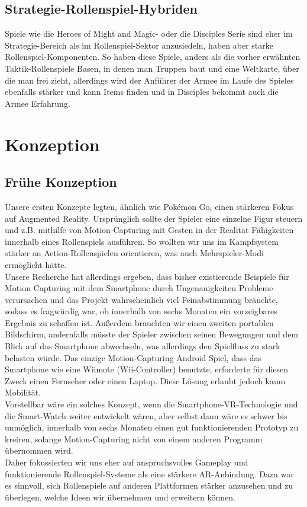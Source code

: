 \documentclass[extern,palatino]{cgBA}
\begin{document}
\subsection{Strategie-Rollenspiel-Hybriden} Spiele wie die Heroes of Might and Magic- oder die Disciples Serie sind eher im Strategie-Bereich als im Rollenspiel-Sektor anzusiedeln, haben aber starke Rollenspiel-Komponenten. So haben diese Spiele, anders als die vorher erwähnten Taktik-Rollenspiele Basen, in denen man Truppen baut und eine Weltkarte, über die man frei zieht, allerdings wird der Anführer der Armee im Laufe des Spieles ebenfalls stärker und kann Items finden und in Disciples bekommt auch die Armee Erfahrung.

\newpage
\section {Konzeption}
\subsection{Frühe Konzeption}
Unsere ersten Konzepte legten, ähnlich wie Pokémon Go, einen stärkeren Fokus auf Augmented Reality. Ursprünglich sollte der Spieler eine einzelne Figur steuern und z.B. mithilfe von Motion-Capturing mit Gesten in der Realität Fähigkeiten innerhalb eines Rollenspiels ausführen. So wollten wir uns im Kampfsystem stärker an Action-Rollenspielen orientieren, was auch Mehrspieler-Modi ermöglicht hätte.
\\Unsere Recherche hat allerdings ergeben, dass bisher existierende Beispiele für Motion Capturing mit dem Smartphone durch Ungenauigkeiten Probleme verursachen und das Projekt wahrscheinlich viel Feinabstimmung bräuchte, sodass es fragwürdig war, ob innerhalb von sechs Monaten ein vorzeigbares Ergebnis zu schaffen ist. Außerdem brauchten wir einen zweiten portablen Bildschirm, andernfalls müsste der Spieler zwischen seinen Bewegungen und dem Blick auf das Smartphone abwechseln, was allerdings den Spielfluss zu stark belasten würde. Das einzige Motion-Capturing Android Spiel, dass das Smartphone wie eine Wiimote (Wii-Controller) benutzte, erforderte für diesen Zweck einen Fernseher oder einen Laptop. Diese Lösung erlaubt jedoch kaum Mobilität.
\\Vorstellbar wäre ein solches Konzept, wenn die Smartphone-VR-Technologie und die Smart-Watch weiter entwickelt wären, aber selbst dann wäre es schwer bis unmöglich, innerhalb von sechs Monaten einen gut funktionierenden Prototyp zu kreiren, solange Motion-Capturing nicht von einem anderen Programm übernommen wird.
\\Daher fokussierten wir uns eher auf anspruchsvolles Gameplay und funktionierende Rollenspiel-Systeme als eine stärkere AR-Anbindung. Dazu war es sinnvoll, sich Rollenspiele auf anderen Plattformen stärker anzusehen und zu überlegen, welche Ideen wir übernehmen und erweitern können.
\newpage
\end{document}
